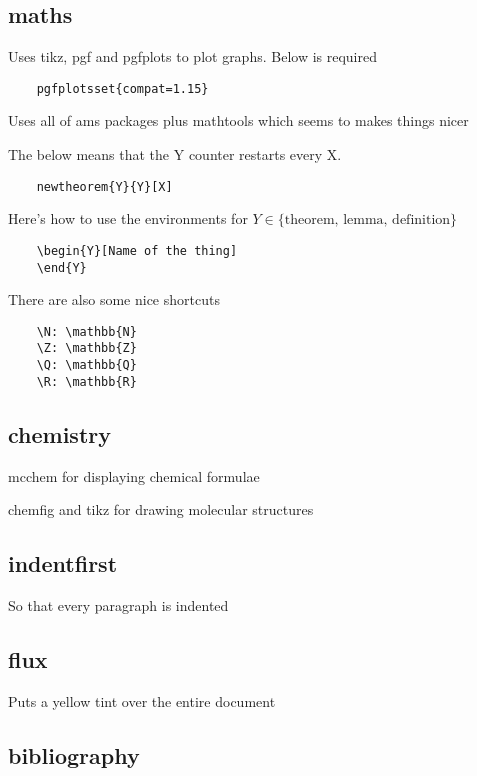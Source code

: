 \documentclass{article}
\begin{document}
\subsection{maths}

Uses tikz, pgf and pgfplots to plot graphs. Below is required
\begin{verbatim}
	pgfplotsset{compat=1.15} 
\end{verbatim}

Uses all of ams packages plus mathtools which seems to makes things nicer

The below means that the Y counter restarts every X.

\begin{verbatim}
	newtheorem{Y}{Y}[X]
\end{verbatim}

Here's how to use the environments for $Y \in \{ \text{theorem, lemma, definition} \}$

\begin{verbatim}
	\begin{Y}[Name of the thing]
	\end{Y}
\end{verbatim}

There are also some nice shortcuts 

\begin{verbatim}
	\N: \mathbb{N}
	\Z: \mathbb{Z}
	\Q: \mathbb{Q}
	\R: \mathbb{R}
\end{verbatim}

\subsection{chemistry}

mcchem for displaying chemical formulae

chemfig and tikz for drawing molecular structures

\subsection{indentfirst}

So that every paragraph is indented

\subsection{flux}

Puts a yellow tint over the entire document

\subsection{bibliography}
\end{document}
